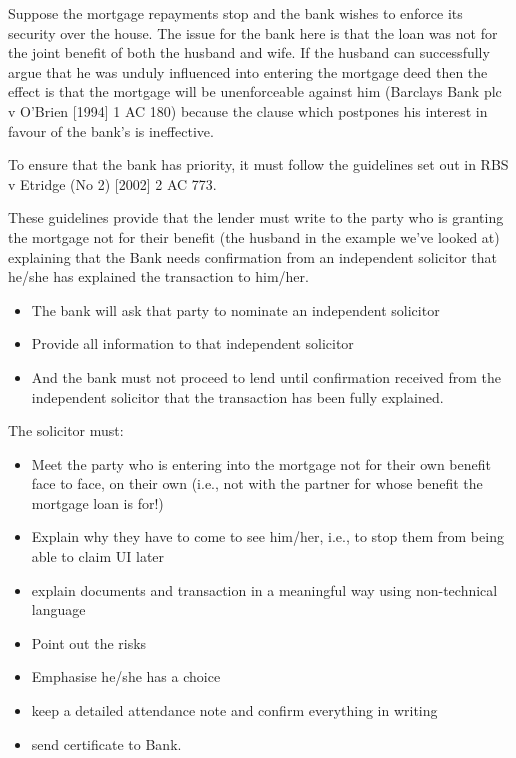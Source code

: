 \documentclass[
]{article}
\providecommand{\tightlist}{%
  \setlength{\itemsep}{0pt}\setlength{\parskip}{0pt}}
\begin{document}
Suppose the mortgage repayments stop and the bank wishes to enforce its
security over the house. The issue for the bank here is that the loan
was not for the joint benefit of both the husband and wife. If the
husband can successfully argue that he was unduly influenced into
entering the mortgage deed then the effect is that the mortgage will be
unenforceable against him (Barclays Bank plc v O'Brien {[}1994{]} 1 AC
180) because the clause which postpones his interest in favour of the
bank's is ineffective.

To ensure that the bank has priority, it must follow the guidelines set
out in RBS v Etridge (No 2) {[}2002{]} 2 AC 773.

These guidelines provide that the lender must write to the party who is
granting the mortgage not for their benefit (the husband in the example
we've looked at) explaining that the Bank needs confirmation from an
independent solicitor that he/she has explained the transaction to
him/her.

\begin{itemize}
\tightlist
\item
  The bank will ask that party to nominate an independent solicitor
\item
  Provide all information to that independent solicitor
\item
  And the bank must not proceed to lend until confirmation received from
  the independent solicitor that the transaction has been fully
  explained.
\end{itemize}

The solicitor must:

\begin{itemize}
\tightlist
\item
  Meet the party who is entering into the mortgage not for their own
  benefit face to face, on their own (i.e., not with the partner for
  whose benefit the mortgage loan is for!)
\item
  Explain why they have to come to see him/her, i.e., to stop them from
  being able to claim UI later
\item
  explain documents and transaction in a meaningful way using
  non-technical language
\item
  Point out the risks
\item
  Emphasise he/she has a choice
\item
  keep a detailed attendance note and confirm everything in writing
\item
  send certificate to Bank.
\end{itemize}
\end{document}
